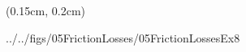 \documentclass[9pt,xcolor={svgnames, x11names},professionalfonts, mathserif]{beamer}
\begin{document}

                                                      \begin{frame}
                                                       \begin{textblock*}{1\columnwidth}(0.15cm, 0.2cm)
                                                        \begin{cfig}[0.6]{../../figs/05FrictionLosses/05FrictionLossesEx8}\end{cfig}
                                                       \end{textblock*}
                                                      \end{frame}
\end{document}
